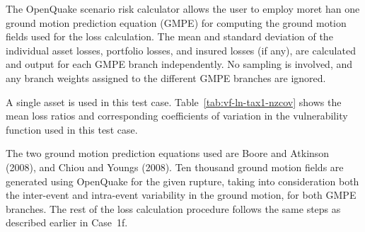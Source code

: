 The OpenQuake scenario risk calculator allows the user to employ moret han one ground motion prediction equation (GMPE) for computing the ground motion fields used for the loss calculation. The mean and standard deviation of the individual asset losses, portfolio losses, and insured losses (if any), are calculated and output for each GMPE branch independently. No sampling is involved, and any branch weights assigned to the different GMPE branches are ignored.

A single asset is used in this test case. Table~\ref{tab:vf-ln-tax1-nzcov} shows the mean loss ratios and corresponding coefficients of variation in the vulnerability function used in this test case.

The two ground motion prediction equations used are Boore and Atkinson (2008), and Chiou and Youngs (2008). Ten thousand ground motion fields are generated using OpenQuake for the given rupture, taking into consideration both the inter-event and intra-event variability in the ground motion, for both GMPE branches. The rest of the loss calculation procedure follows the same steps as described earlier in Case~1f.